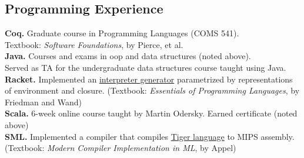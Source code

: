 \documentclass[margin,line]{resume}
\begin{document}
\begin{resume}
    

    
    
    
 


    \section{\mysidestyle Programming Experience} 
     
    \textbf{Coq.} Graduate course in Programming Languages ({\small COMS} 541).\\
    Textbook: {\it Software Foundations}, by Pierce, et al. \\[\mymedskip]
    \textbf{Java.} Courses and exams in oop and data structures (noted above).\\
    Served as TA for the undergraduate data structures course taught using Java.\\[\mymedskip]
    \textbf{Racket.} Implemented an \href{https://github.com/hyeyoungshin/hy_eopl}{interpreter generator} parametrized by representations of environment and closure. (Textbook: {\it Essentials of Programming Languages}, by Friedman and Wand)\\[\mymedskip]
    \textbf{Scala.} 6-week online course taught by Martin Odersky. Earned certificate (noted above) \\[\mymedskip]
    \textbf{SML.} Implemented a compiler that compiles \href{https://www.cs.princeton.edu/~appel/modern/ml/}{Tiger language} to MIPS assembly.\\ 
    (Textbook: {\it Modern Compiler Implementation in ML}, by Appel)


\end{resume}
\end{document}
